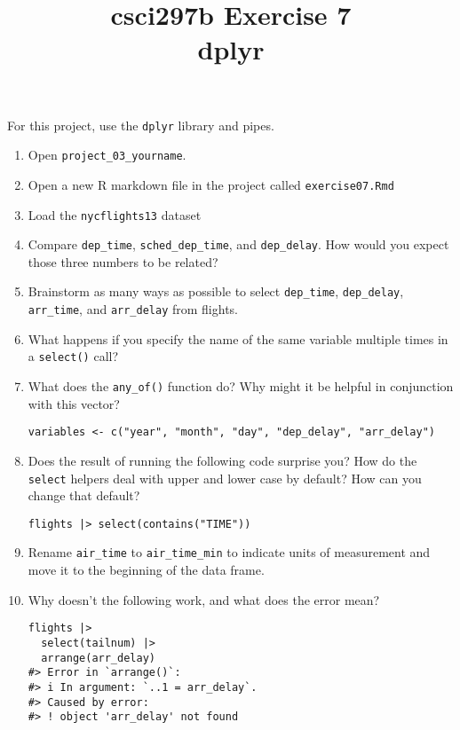 \documentclass[12pt]{article}
\title{csci297b Exercise 7\\dplyr
  }
\date{}
\begin{document}
\maketitle

For this project, use the {\tt dplyr} library and pipes.

\begin{enumerate}

\item Open
\verb|project_03_yourname|.  


\item Open a new R markdown file in the project called \verb|exercise07.Rmd|

\item Load the {\tt nycflights13} dataset

\item  Compare \verb|dep_time|, 
\verb|sched_dep_time|, and 
\verb|dep_delay|. How would you expect those three numbers to be related?

\item
Brainstorm as many ways as possible to select \verb|dep_time|, 
\verb|dep_delay|, \verb|arr_time|, and \verb|arr_delay| from flights.

\item

What happens if you specify the name of the same variable multiple times in a 
\verb|select()| call?

\item
What does the \verb|any_of()| function do? Why might it be helpful in conjunction with this vector?
\begin{verbatim}
variables <- c("year", "month", "day", "dep_delay", "arr_delay")
\end{verbatim}

\item
Does the result of running the following code surprise you? How do the \verb|select|
helpers deal with upper and lower case by default? How can you change that default?

\begin{verbatim}
flights |> select(contains("TIME"))
\end{verbatim}

\item
Rename \verb|air_time| to \verb|air_time_min| to indicate units of measurement and move it to the beginning of the data frame.

\item

Why doesn’t the following work, and what does the error mean?
\begin{verbatim}
flights |> 
  select(tailnum) |> 
  arrange(arr_delay)
#> Error in `arrange()`:
#> i In argument: `..1 = arr_delay`.
#> Caused by error:
#> ! object 'arr_delay' not found
\end{verbatim}

\end{enumerate}
\end{document}
